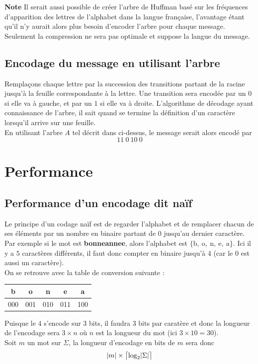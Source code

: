 \documentclass[a4paper, 12pt]{article}
\DeclarePairedDelimiter{\ceil}{\lceil}{\rceil}
\begin{document}
\textbf{Note}
Il serait aussi possible de créer l'arbre de Huffman basé sur les fréquences d'apparition des lettres de l'alphabet dans la langue française, l'avantage étant qu'il n'y aurait alors plus besoin d'encoder l'arbre pour chaque message. Seulement la compression ne sera pas optimale et suppose la langue du message.

\subsection{Encodage du message en utilisant l'arbre}
Remplaçons chaque lettre par la succession des transitions partant de la racine jusqu'à la feuille correspondante à la lettre. Une transition sera encodée par un $0$ si elle va à gauche, et par un $1$ si elle va à droite. L'algorithme de décodage ayant connaissance de l'arbre, il sait quand se termine la définition d'un caractère lorsqu'il arrive sur une feuille. \\
En utilisant l'arbre $A$ tel décrit dans ci-dessus, le message serait alors encodé par
$$
11\ 0\ 10\ 0
$$

\newpage

\section{Performance}

\subsection{Performance d'un encodage dit naïf}
Le principe d'un codage naïf est de regarder l'alphabet et de remplacer chacun de ses éléments par un nombre en binaire partant de $0$ jusqu'au dernier caractère. Par exemple si le mot est \textbf{bonneannee}, alors l'alphabet est $\{\text{b},\ \text{o},\ \text{n},\ \text{e},\ \text{a}\}$. Ici il y a $5$ caractères différents, il faut donc compter en binaire jusqu'à $4$ (car le $0$ est aussi un caractère). \\
On se retrouve avec la table de conversion suivante :
\begin{center}
	\begin{tabular}{ | c | c | c | c | c | }
		\hline
		b & o & n & e & a \\ \hline
		000 & 001 & 010 & 011 & 100 \\
		\hline
	\end{tabular}
\end{center}
Puisque le $4$ s'encode sur $3$ bits, il faudra $3$ bits par caratère et donc la longueur de l'encodage sera $3\times n$ où $n$ est la longueur du mot (ici $3\times 10 = 30$). \\
Soit $m$ un mot sur $\Sigma$, la longueur d'encodage en bits de $m$ sera donc
$$
|m|\times \ceil[\big]{\text{log}_2|\Sigma|}
$$
\end{document}
